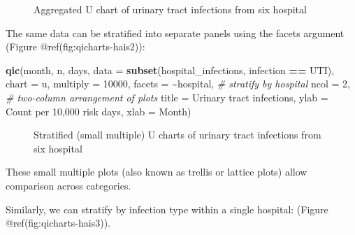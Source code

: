 \documentclass[
]{book}
\makeatletter
\newenvironment{Shaded}{\begin{snugshade}}{\end{snugshade}}
\newcommand{\AttributeTok}[1]{\textcolor[rgb]{0.13,0.29,0.53}{#1}}
\newcommand{\CommentTok}[1]{\textcolor[rgb]{0.56,0.35,0.01}{\textit{#1}}}
\newcommand{\DecValTok}[1]{\textcolor[rgb]{0.00,0.00,0.81}{#1}}
\newcommand{\FunctionTok}[1]{\textcolor[rgb]{0.13,0.29,0.53}{\textbf{#1}}}
\newcommand{\NormalTok}[1]{#1}
\newcommand{\SpecialCharTok}[1]{\textcolor[rgb]{0.81,0.36,0.00}{\textbf{#1}}}
\newcommand{\StringTok}[1]{\textcolor[rgb]{0.31,0.60,0.02}{#1}}
\newcommand*\pandocbounded[1]{%
  \sbox\pandoc@box{#1}%
  \Gscale@div\@tempa{\textheight}{\dimexpr\ht\pandoc@box+\dp\pandoc@box\relax}%
  \Gscale@div\@tempb{\linewidth}{\wd\pandoc@box}%
  \ifdim\@tempb\p@<\@tempa\p@\let\@tempa\@tempb\fi%
  \ifdim\@tempa\p@<\p@\scalebox{\@tempa}{\usebox\pandoc@box}%
  \else\usebox{\pandoc@box}%
  \fi%
}
\makeatother
\begin{document}
\begin{figure}
\centering
\pandocbounded{}
\caption{Aggregated U chart of urinary tract infections from six
hospital}
\end{figure}

The same data can be stratified into separate panels using the facets
argument (Figure @ref(fig:qicharts-hais2)):

\begin{Shaded}
\begin{Highlighting}[]
\FunctionTok{qic}\NormalTok{(month, n, days, }
    \AttributeTok{data     =} \FunctionTok{subset}\NormalTok{(hospital\_infections, }
\NormalTok{                      infection }\SpecialCharTok{==} \StringTok{\textquotesingle{}UTI\textquotesingle{}}\NormalTok{),}
    \AttributeTok{chart    =} \StringTok{\textquotesingle{}u\textquotesingle{}}\NormalTok{,}
    \AttributeTok{multiply =} \DecValTok{10000}\NormalTok{,}
    \AttributeTok{facets   =} \SpecialCharTok{\textasciitilde{}}\NormalTok{hospital,                     }\CommentTok{\# stratify by hospital}
    \AttributeTok{ncol     =} \DecValTok{2}\NormalTok{,                             }\CommentTok{\# two{-}column arrangement of plots}
    \AttributeTok{title    =} \StringTok{\textquotesingle{}Urinary tract infections\textquotesingle{}}\NormalTok{,}
    \AttributeTok{ylab     =} \StringTok{\textquotesingle{}Count per 10,000 risk days\textquotesingle{}}\NormalTok{,}
    \AttributeTok{xlab     =} \StringTok{\textquotesingle{}Month\textquotesingle{}}\NormalTok{)}
\end{Highlighting}
\end{Shaded}

\begin{figure}
\centering
\pandocbounded{}
\caption{Stratified (small multiple) U charts of urinary tract
infections from six hospital}
\end{figure}

These small multiple plots (also known as trellis or lattice plots)
allow comparison across categories.

Similarly, we can stratify by infection type within a single hospital:
(Figure @ref(fig:qicharts-hais3)).
\end{document}
